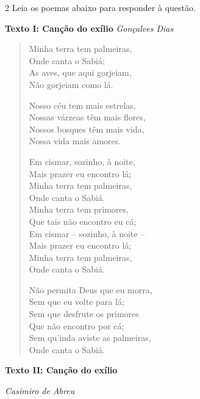 \num{2} Leia os poemas abaixo para responder à questão. 

\begin{myquote}

\textbf{Texto I: Canção do exílio}
\emph{Gonçalves Dias}

\begin{verse}

Minha terra tem palmeiras, \\
Onde canta o Sabiá; \\
As aves, que aqui gorjeiam, \\
Não gorjeiam como lá. 

Nosso céu tem mais estrelas,\\
Nossas várzeas têm mais flores, \\
Nossos bosques têm mais vida, \\
Nossa vida mais amores.

Em cismar, sozinho, à noite, \\
Mais prazer eu encontro lá; \\
Minha terra tem palmeiras, \\
Onde canta o Sabiá. \\

Minha terra tem primores, \\
Que tais não encontro eu cá; \\
Em cismar -- sozinho, à noite -- \\
Mais prazer eu encontro lá; \\
Minha terra tem palmeiras, \\
Onde canta o Sabiá. 

Não permita Deus que eu morra, \\
Sem que eu volte para lá; \\
Sem que desfrute os primores \\
Que não encontro por cá; \\
Sem qu'inda aviste as palmeiras, \\
Onde canta o Sabiá.

\end{verse}


\textbf{Texto II: Canção do exílio}

\emph{Casimiro de Abreu}

\begin{verse}


\end{verse}
\end{myquote}
